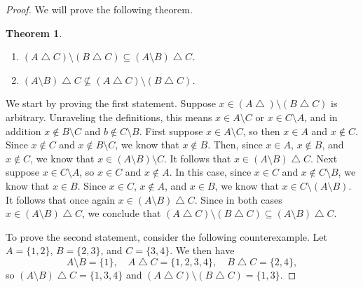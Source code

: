 \documentclass[12pt]{amsart}
\newtheorem{theorem}{Theorem}
\theoremstyle{definition}
\theoremstyle{remark}
\begin{document}
\begin{proof}
We will prove the following theorem.
\begin{theorem}
	\hfill
	\begin{enumerate}
		\item $(A \bigtriangleup C) \setminus (B \bigtriangleup C) \subseteq
		(A \setminus B) \bigtriangleup C$.
	
		\item $(A \setminus B) \bigtriangleup C \nsubseteq
		(A \bigtriangleup C) \setminus (B \bigtriangleup C)$.
	\end{enumerate}
\end{theorem}
We start by proving the first statement.
Suppose $x \in (A \bigtriangleup) \setminus (B \bigtriangleup C)$ is arbitrary.
Unraveling the definitions, this means $x \in A \setminus C$ or $x \in C \setminus A$, and in addition $x \notin B \setminus C$ and $b \notin C \setminus B$.
First suppose $x \in A \setminus C$, so then $x \in A$ and $x \notin C$.
Since $x \notin C$ and $x \notin B \setminus C$, we know that $x \notin B$.
Then, since $x \in A$, $x \notin B$, and $x \notin C$, we know that $x \in (A \setminus B) \setminus C$.
It follows that $x \in (A \setminus B) \bigtriangleup C$.
Next suppose $x \in C \setminus A$, so $x \in C$ and $x \notin A$.
In this case, since $x \in C$ and $x \notin C \setminus B$, we know that $x \in B$.
Since $x \in C$, $x \notin A$, and $x \in B$, we know that $x \in C \setminus (A \setminus B)$.
It follows that once again $x \in (A \setminus B) \bigtriangleup C$.
Since in both cases $x \in (A \setminus B) \bigtriangleup C$, we conclude that $(A \bigtriangleup C) \setminus (B \bigtriangleup C) \subseteq (A \setminus B) \bigtriangleup C$.

To prove the second statement, consider the following counterexample.
Let $A = \{ 1, 2 \}$, $B = \{ 2, 3 \}$, and $C = \{ 3, 4 \}$.
We then have
\begin{equation*}
	A \setminus B = \{ 1 \}, \quad
	A \bigtriangleup C = \{ 1, 2, 3, 4 \}, \quad
	B \bigtriangleup C = \{ 2, 4 \},
\end{equation*}
so $(A \setminus B) \bigtriangleup C = \{ 1, 3, 4 \}$ and $(A \bigtriangleup C) \setminus (B \bigtriangleup C) = \{ 1, 3 \}$.
\end{proof}
\end{document}
